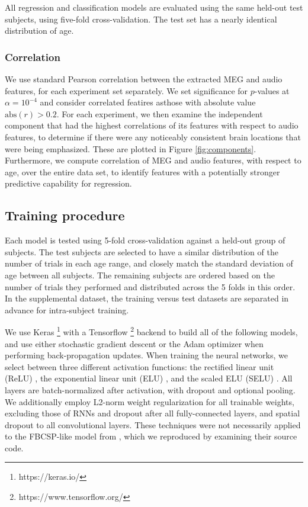 \documentclass[utf8]{frontiersSCNS} %
\begin{document}
All regression and classification models are evaluated using the same held-out test subjects, using five-fold cross-validation. The test set has a nearly identical distribution of age.

\subsubsection{Correlation}

We use standard Pearson correlation between the extracted MEG and audio features, for each experiment set separately. We set significance for $p$-values at $\alpha = 10^{-4}$ and consider correlated featires asthose with absolute value $\text{abs}(r) > 0.2$. For each experiment, we then examine the independent component that had the highest correlations of its features with respect to audio features, to determine if there were any noticeably consistent brain locations that were being emphasized. These are plotted in Figure \ref{fig:components}. Furthermore, we compute correlation of MEG and audio features, with respect to age, over the entire data set, to identify features with a potentially stronger predictive capability for regression.

\subsection{Training procedure} \label{sec:train_proc}

Each model is tested using 5-fold cross-validation against a held-out group of subjects. The test subjects are selected to have a similar distribution of the number of trials in each age range, and closely match the standard deviation of age between all subjects. The remaining subjects are ordered based on the number of trials they performed and distributed across the 5 folds in this order. In the supplemental dataset, the training versus test datasets are separated in advance for intra-subject training.

We use Keras \footnote{https://keras.io/} with a Tensorflow \footnote{https://www.tensorflow.org/} backend to build all of the following models, and use either stochastic gradient descent or the Adam optimizer  when performing back-propagation updates. When training the neural networks, we select between three different activation functions: the rectified linear unit (ReLU) \cite{He2015a}, the exponential linear unit (ELU) \cite{Clevert}, and the scaled ELU (SELU) \cite{NIPS2017_6698}. All layers are batch-normalized \cite{Szegedy2015} after activation, with dropout and optional pooling. We additionally employ L2-norm weight regularization for all trainable weights, excluding those of RNNs and dropout \cite{} after all fully-connected layers, and spatial dropout \cite{} to all convolutional layers. These techniques were not necessarily applied to the FBCSP-like model from \cite{Schirrmeister2017}, which we reproduced by examining their source code.
\end{document}

